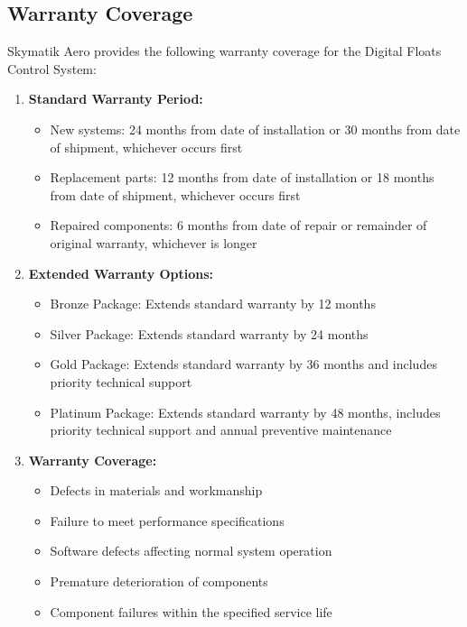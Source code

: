 \documentclass[12pt,a4paper,twoside,openright]{book}
\begin{document}
\subsection{Warranty Coverage}

Skymatik Aero provides the following warranty coverage for the Digital Floats Control System:

\begin{enumerate}
    \item \textbf{Standard Warranty Period:}
    \begin{itemize}
        \item New systems: 24 months from date of installation or 30 months from date of shipment, whichever occurs first
        \item Replacement parts: 12 months from date of installation or 18 months from date of shipment, whichever occurs first
        \item Repaired components: 6 months from date of repair or remainder of original warranty, whichever is longer
    \end{itemize}
    
    \item \textbf{Extended Warranty Options:}
    \begin{itemize}
        \item Bronze Package: Extends standard warranty by 12 months
        \item Silver Package: Extends standard warranty by 24 months
        \item Gold Package: Extends standard warranty by 36 months and includes priority technical support
        \item Platinum Package: Extends standard warranty by 48 months, includes priority technical support and annual preventive maintenance
    \end{itemize}
    
    \item \textbf{Warranty Coverage:}
    \begin{itemize}
        \item Defects in materials and workmanship
        \item Failure to meet performance specifications
        \item Software defects affecting normal system operation
        \item Premature deterioration of components
        \item Component failures within the specified service life
    \end{itemize}
    

\end{enumerate}
\end{document}
